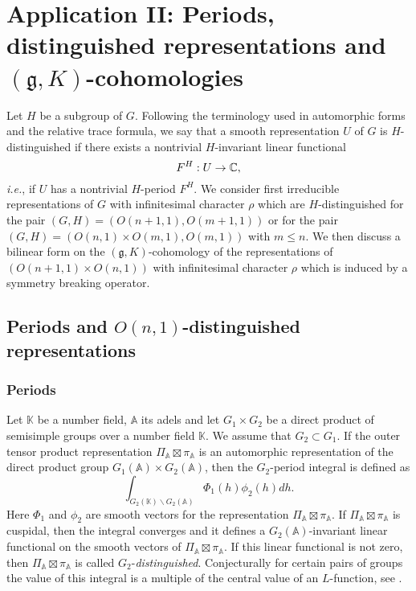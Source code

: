 \newpage
\section{Application II:
 Periods, distinguished representations and $(\mathfrak{g},K)$-cohomologies}
\label{sec:period}

Let $H$ be a subgroup of $G$.  
Following the terminology used in automorphic forms and the relative trace formula,
 we say that a smooth representation $U$ of $G$ is $H$-distinguished if
there exists 
 a nontrivial $H$-invariant linear functional 
\[
   F^{H}:U \rightarrow {\mathbb C}, 
\]
 {\it{i.e.}}, 
 if $U$ has a nontrivial 
$H$-period $F^{H}$. 
We consider first irreducible representations of $G$
 with infinitesimal character $\rho$ which are $H$-distinguished
 for the  pair $(G,H)=(O(n+1,1),O(m+1,1))$ 
 or for the pair $(G,H)= (O(n,1) \times O(m,1), O(m,1))$  with $m \le n$.  
We then discuss  a bilinear form on the $(\mathfrak{g},K)$-cohomology
 of the representations of $(O(n+1,1) \times O(n,1))$
 with infinitesimal character $\rho$
 which is induced by a symmetry breaking operator.  



\subsection{Periods and $O(n,1)$-distinguished representations}
\subsubsection{Periods}
Let $\mathbb K$ be a number field, $\mathbb A$ its adels and 
 let $G_1\times G_2$ be a direct product
 of semisimple groups over a number field $\mathbb K$. 
We assume that $G_2 \subset G_1$. 
If the outer tensor product representation
 $\Pi_{\mathbb A} \boxtimes \pi_{\mathbb A}$ is an automorphic representation
 of the direct product group $G_1({\mathbb A}) \times G_2({\mathbb A})$, 
 then the $G_2$-period integral is defined as
\[
  \int_{G_2({\mathbb K} )\backslash G_2({\mathbb A} )}\Phi_1 (h) \phi_2(h) dh.
\]
Here $\Phi_1$ and $\phi_2$ are smooth vectors
 for the representation $\Pi_{\mathbb A} \boxtimes \pi_{\mathbb A}$. 
If $\Pi_{\mathbb A} \boxtimes \pi_{\mathbb A}$ is cuspidal, 
 then the integral converges and 
it defines a $G_2({\mathbb A})$-invariant linear functional
 on the smooth vectors of $\Pi_{\mathbb A} \boxtimes \pi_{\mathbb A}$.  
If this linear functional is not zero,
 then $\Pi_{\mathbb A}\boxtimes \pi_{\mathbb A}$
 is called $G_2$-{\it{distinguished}}. 
Conjecturally for certain pairs of groups
 the value of this integral is a multiple
 of the central value of an $L$-function, 
 see \cite{A1, II, IY}.


